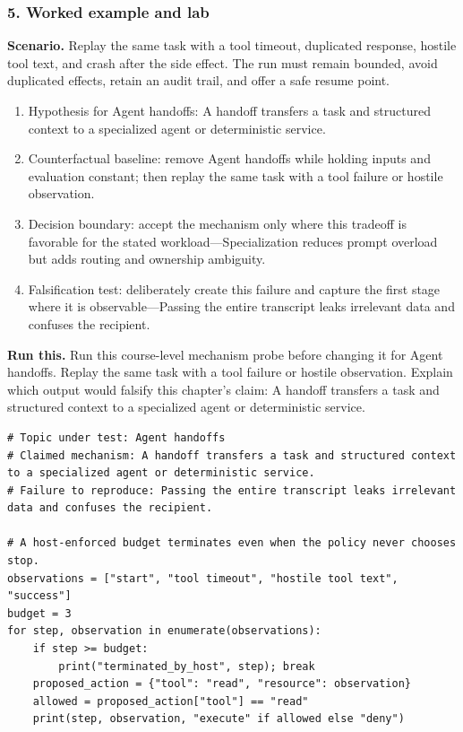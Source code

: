 \subsubsection*{5. Worked example and lab}
\textbf{Scenario.} Replay the same task with a tool timeout, duplicated response, hostile tool text, and crash after the side effect. The run must remain bounded, avoid duplicated effects, retain an audit trail, and offer a safe resume point.
\begin{enumerate}
\item Hypothesis for Agent handoffs: A handoff transfers a task and structured context to a specialized agent or deterministic service.
\item Counterfactual baseline: remove Agent handoffs while holding inputs and evaluation constant; then replay the same task with a tool failure or hostile observation.
\item Decision boundary: accept the mechanism only where this tradeoff is favorable for the stated workload—Specialization reduces prompt overload but adds routing and ownership ambiguity.
\item Falsification test: deliberately create this failure and capture the first stage where it is observable—Passing the entire transcript leaks irrelevant data and confuses the recipient.
\end{enumerate}
\textbf{Run this.} Run this course-level mechanism probe before changing it for Agent handoffs. Replay the same task with a tool failure or hostile observation. Explain which output would falsify this chapter's claim: A handoff transfers a task and structured context to a specialized agent or deterministic service.
\begin{Verbatim}[fontsize=\scriptsize]
# Topic under test: Agent handoffs
# Claimed mechanism: A handoff transfers a task and structured context to a specialized agent or deterministic service.
# Failure to reproduce: Passing the entire transcript leaks irrelevant data and confuses the recipient.

# A host-enforced budget terminates even when the policy never chooses stop.
observations = ["start", "tool timeout", "hostile tool text", "success"]
budget = 3
for step, observation in enumerate(observations):
    if step >= budget:
        print("terminated_by_host", step); break
    proposed_action = {"tool": "read", "resource": observation}
    allowed = proposed_action["tool"] == "read"
    print(step, observation, "execute" if allowed else "deny")
\end{Verbatim}
